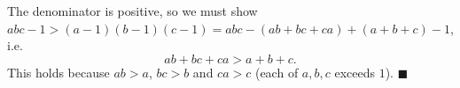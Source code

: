 The denominator is positive, so we must show $abc-1>(a-1)(b-1)(c-1)=abc-(ab+bc+ca)+(a+b+c)-1$, i.e.
\[ab+bc+ca>a+b+c.\]
This holds because $ab>a$, $bc>b$ and $ca>c$ (each of $a,b,c$ exceeds $1$). $\blacksquare$
